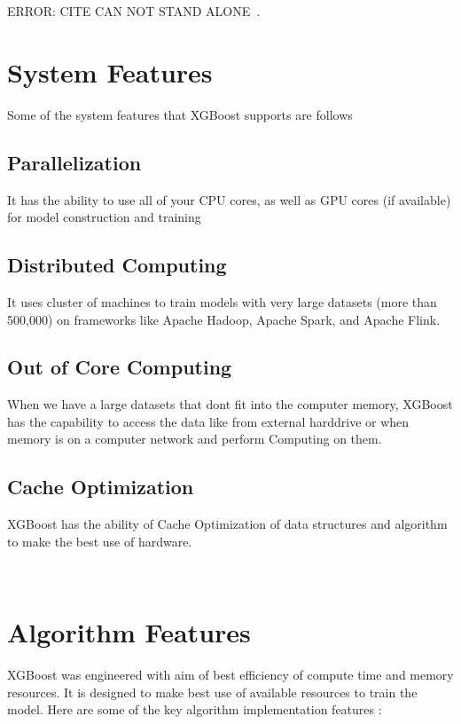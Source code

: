 ERROR: CITE CAN NOT STAND ALONE~\cite{hid-sp18-401-XGBoost-MLmastery}.


\section{System Features}

Some of the system features that XGBoost supports are follows 

\subsection{Parallelization}

It has the ability to use all of your CPU cores, as well as GPU cores (if
available) for model construction and training

\subsection{Distributed Computing}

It uses cluster of machines to train models with very large datasets (more than
500,000) on frameworks like Apache Hadoop, Apache Spark, and Apache Flink.

\subsection{Out of Core Computing}

When we have a large datasets that dont fit into the computer memory, XGBoost
has the capability to access the data  like from external harddrive or when
memory is on a computer network and perform Computing on them.

\subsection{Cache Optimization}  XGBoost has the ability of Cache Optimization
of data structures and algorithm to make the best use of hardware.

~\cite{hid-sp18-401-XGBoost-MLmastery}

\section{Algorithm Features} 

XGBoost was engineered with aim of best efficiency of compute time and memory
resources. It is designed to make best use of available resources to train the
model. Here are some of the key algorithm implementation features :

